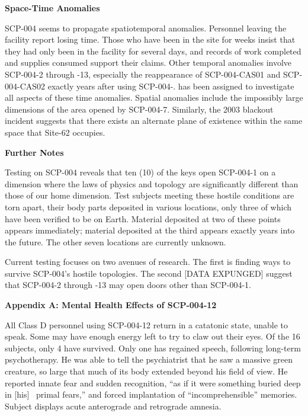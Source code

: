 \begin{flushleft}
\textbf{Space-Time Anomalies}
\end{flushleft}

SCP-004 seems to propagate spatiotemporal anomalies. Personnel leaving the facility report losing time. Those who have been in the site for weeks insist that they had only been in the facility for several days, and records of work completed and supplies consumed support their claims. Other temporal anomalies involve SCP-004-2 through -13, especially the reappearance of SCP-004-CAS01 and SCP-004-CAS02 exactly  years after using SCP-004-.  has been assigned to investigate all aspects of these time anomalies. Spatial anomalies include the impossibly large dimensions of the area opened by SCP-004-7. Similarly, the 2003 blackout incident suggests that there exists an alternate plane of existence within the same space that Site-62 occupies.

\begin{flushleft}
\textbf{Further Notes}
\end{flushleft}

Testing on SCP-004 reveals that ten (10) of the keys open SCP-004-1 on a dimension where the laws of physics and topology are significantly different than those of our home dimension. Test subjects meeting these hostile conditions are torn apart, their body parts deposited in various locations, only three of which have been verified to be on Earth. Material deposited at two of these points appears immediately; material deposited at the third appears exactly  years into the future. The other seven locations are currently unknown.

Current testing focuses on two avenues of research. The first is finding ways to survive SCP-004’s hostile topologies. The second [DATA EXPUNGED] suggest that SCP-004-2 through -13 may open doors other than SCP-004-1.

\begin{flushleft}
\textbf{Appendix A: Mental Health Effects of SCP-004-12}
\end{flushleft}

All Class D personnel using SCP-004-12 return in a catatonic state, unable to speak. Some may have enough energy left to try to claw out their eyes. Of the 16 subjects, only 4 have survived. Only one has regained speech, following long-term psychotherapy. He was able to tell the psychiatrist that he saw a massive green creature, so large that much of its body extended beyond his field of view. He reported innate fear and sudden recognition, “as if it were something buried deep in [his] \ primal fears,” and forced implantation of “incomprehensible” memories. Subject displays acute anterograde and retrograde amnesia.

